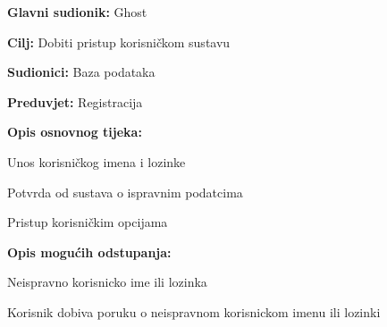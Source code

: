 						\noindent {}
					\begin{packed_item}
						
						\item \textbf{Glavni sudionik: }Ghost
						\item  \textbf{Cilj:} Dobiti pristup korisničkom sustavu
						\item  \textbf{Sudionici:} Baza podataka
						\item  \textbf{Preduvjet:} Registracija
						\item  \textbf{Opis osnovnog tijeka:}
						
						\item[] \begin{packed_enum}
							
							\item Unos korisničkog imena i lozinke
							\item Potvrda od sustava o ispravnim podatcima
							\item Pristup korisničkim opcijama
						\end{packed_enum}
						
						\item  \textbf{Opis mogućih odstupanja:}
						
						\item[] \begin{packed_item}
							
							\item[2.a] Neispravno korisnicko ime ili lozinka
							\item[] \begin{packed_enum}
								
								\item Korisnik dobiva poruku o neispravnom korisnickom imenu ili lozinki
							\end{packed_enum}

						\end{packed_item}
					\end{packed_item}
					
